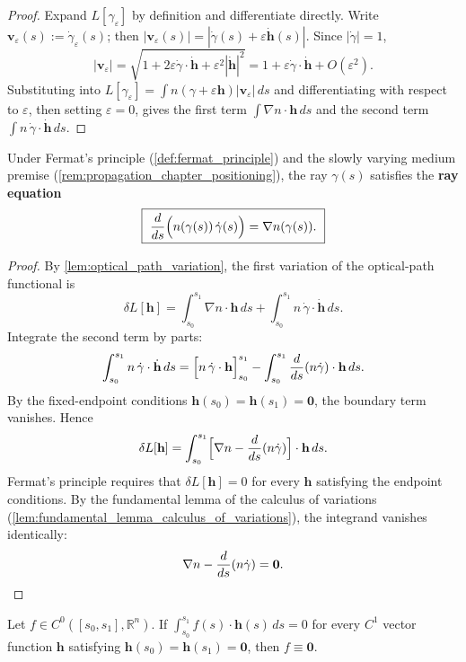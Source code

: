 \begin{proof}
Expand $L[\gamma_\varepsilon]$ by definition and differentiate directly. Write $\mathbf{v}_\varepsilon(s) := \dot\gamma_\varepsilon(s)$; then $|\mathbf{v}_\varepsilon(s)| = |\dot\gamma(s) + \varepsilon\dot{\mathbf{h}}(s)|$. Since $|\dot\gamma|=1$,
\[
|\mathbf{v}_\varepsilon| = \sqrt{1 + 2\varepsilon\dot\gamma\cdot\dot{\mathbf{h}} + \varepsilon^2|\dot{\mathbf{h}}|^2} = 1 + \varepsilon\dot\gamma\cdot\dot{\mathbf{h}} + O(\varepsilon^2).
\]
Substituting into $L[\gamma_\varepsilon] = \int n(\gamma+\varepsilon\mathbf{h})|\mathbf{v}_\varepsilon|\,ds$ and differentiating with respect to $\varepsilon$, then setting $\varepsilon=0$, gives the first term $\int\nabla n\cdot\mathbf{h}\,ds$ and the second term $\int n\,\dot\gamma\cdot\dot{\mathbf{h}}\,ds$.
\end{proof}

\begin{theorem}\label{thm:ray_equation}
Under Fermat's principle (\cref{def:fermat_principle}) and the slowly varying medium premise (\cref{rem:propagation_chapter_positioning}), the ray $\gamma(s)$ satisfies the \textbf{ray equation}
\[
\boxed{\ \frac{d}{ds}\Bigl(n(\gamma(s))\,\dot\gamma(s)\Bigr) = \nabla n(\gamma(s)).\ }
\]
\end{theorem}

\begin{proof}
By \cref{lem:optical_path_variation}, the first variation of the optical-path functional is
\[
\delta L[\mathbf{h}] = \int_{s_0}^{s_1}\nabla n\cdot\mathbf{h}\,ds + \int_{s_0}^{s_1}n\,\dot\gamma\cdot\dot{\mathbf{h}}\,ds.
\]
Integrate the second term by parts:
\[
\int_{s_0}^{s_1}n\,\dot\gamma\cdot\dot{\mathbf{h}}\,ds = \Bigl[n\,\dot\gamma\cdot\mathbf{h}\Bigr]_{s_0}^{s_1} - \int_{s_0}^{s_1}\frac{d}{ds}(n\dot\gamma)\cdot\mathbf{h}\,ds.
\]
By the fixed-endpoint conditions $\mathbf{h}(s_0)=\mathbf{h}(s_1)=\mathbf{0}$, the boundary term vanishes. Hence
\[
\delta L[\mathbf{h}] = \int_{s_0}^{s_1}\Bigl[\nabla n - \frac{d}{ds}(n\dot\gamma)\Bigr]\cdot\mathbf{h}\,ds.
\]
Fermat's principle requires that $\delta L[\mathbf{h}]=0$ for every $\mathbf{h}$ satisfying the endpoint conditions. By the fundamental lemma of the calculus of variations (\cref{lem:fundamental_lemma_calculus_of_variations}), the integrand vanishes identically:
\[
\nabla n - \frac{d}{ds}(n\dot\gamma) = \mathbf{0}. \qedhere
\]
\end{proof}

\begin{lemma}\label{lem:fundamental_lemma_calculus_of_variations}
Let $f\in C^0([s_0,s_1],\mathbb{R}^n)$. If $\int_{s_0}^{s_1}f(s)\cdot\mathbf{h}(s)\,ds = 0$ for every $C^1$ vector function $\mathbf{h}$ satisfying $\mathbf{h}(s_0)=\mathbf{h}(s_1)=\mathbf{0}$, then $f\equiv\mathbf{0}$.
\end{lemma}

